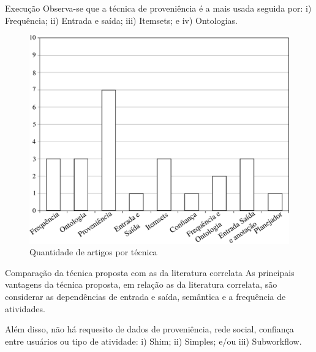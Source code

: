 \begin{frame}		
	\begin{block}{Execução}
		Observa-se que a técnica de proveniência é a mais usada seguida por: i) Frequência; ii) Entrada e saída; iii) Itemsets; e iv) Ontologias.
		\begin{figure}
			\begin{minipage}[b]{0.6\textwidth}
				\includegraphics[width=\textwidth]{./secoes/RevisaoDaLiteratura/GraficoQuantidadeTecnica.eps}
				\caption{Quantidade de artigos por técnica}
			\end{minipage}
		\end{figure}
		
	\end{block}
\end{frame}

\begin{frame}		
	\begin{block}{Comparação da técnica proposta com as da literatura correlata}
		As principais vantagens da técnica proposta, em relação as da literatura correlata, são considerar as dependências de entrada e saída, semântica e a frequência de atividades. 
		
		Além disso, não há requesito de dados de proveniência, rede social, confiança entre usuários ou tipo de atividade: i) Shim; ii) Simples; e/ou iii) Subworkflow.
	\end{block}
\end{frame}


